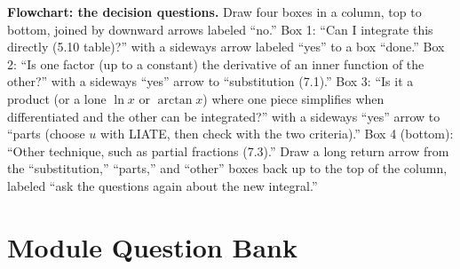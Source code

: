 \documentclass[11pt]{article}
\begin{document}
\begin{notebox}
\textbf{Flowchart: the decision questions.} Draw four boxes in a column, top to bottom, joined by downward arrows labeled ``no.'' Box 1: ``Can I integrate this directly (5.10 table)?'' with a sideways arrow labeled ``yes'' to a box ``done.'' Box 2: ``Is one factor (up to a constant) the derivative of an inner function of the other?'' with a sideways ``yes'' arrow to ``substitution (7.1).'' Box 3: ``Is it a product (or a lone $\ln x$ or $\arctan x$) where one piece simplifies when differentiated and the other can be integrated?'' with a sideways ``yes'' arrow to ``parts (choose $u$ with LIATE, then check with the two criteria).'' Box 4 (bottom): ``Other technique, such as partial fractions (7.3).'' Draw a long return arrow from the ``substitution,'' ``parts,'' and ``other'' boxes back up to the top of the column, labeled ``ask the questions again about the new integral.''
\end{notebox}

\section{Module Question Bank}
\end{document}
